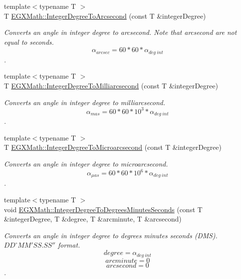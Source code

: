 \begin{DoxyCompactItemize}
{\footnotesize template$<$typename T $>$ }\\T \mbox{\hyperlink{group___e_g_x_math-_angle_conversions-_integer_degree_gaa04058a2fea3dc3678264a05fac6e1ae}{E\+G\+X\+Math\+::\+Integer\+Degree\+To\+Arcsecond}} (const T \&integer\+Degree)
\begin{DoxyCompactList}\small\item\em Converts an angle in integer degree to arcsecond. Note that arcsecond are not equal to seconds. \[\alpha_{arcsec}=60 * 60 * \alpha_{deg\ int}\]. \end{DoxyCompactList}\item 
{\footnotesize template$<$typename T $>$ }\\T \mbox{\hyperlink{group___e_g_x_math-_angle_conversions-_integer_degree_gadc43f22e832cd8fcf16b7bd2269ae348}{E\+G\+X\+Math\+::\+Integer\+Degree\+To\+Milliarcsecond}} (const T \&integer\+Degree)
\begin{DoxyCompactList}\small\item\em Converts an angle in integer degree to milliarcsecond. \[\alpha_{mas}=60 * 60 * 10^3 * \alpha_{deg\ int} \]. \end{DoxyCompactList}\item 
{\footnotesize template$<$typename T $>$ }\\T \mbox{\hyperlink{group___e_g_x_math-_angle_conversions-_integer_degree_ga69179d6082764595c7014805e1f6b31e}{E\+G\+X\+Math\+::\+Integer\+Degree\+To\+Microarcsecond}} (const T \&integer\+Degree)
\begin{DoxyCompactList}\small\item\em Converts an angle in integer degree to microarcsecond. \[\alpha_{\mu as}=60 * 60 * 10^6 * \alpha_{deg\ int}\]. \end{DoxyCompactList}\item 
{\footnotesize template$<$typename T $>$ }\\void \mbox{\hyperlink{group___e_g_x_math-_angle_conversions-_integer_degree_ga204317877546ea6bbafe5ff558f55a16}{E\+G\+X\+Math\+::\+Integer\+Degree\+To\+Degrees\+Minutes\+Seconds}} (const T \&integer\+Degree, T \&degree, T \&arcminute, T \&arcsecond)
\begin{DoxyCompactList}\small\item\em Converts an angle in integer degree to degrees minutes seconds (D\+MS). ${DD}^{\circ}{MM}'{SS.SS}''$ format. \[degree=\alpha_{deg\ int}\] \[arcminute= 0\] \[arcsecond= 0\]. \end{DoxyCompactList}\item 

\end{DoxyCompactItemize}
